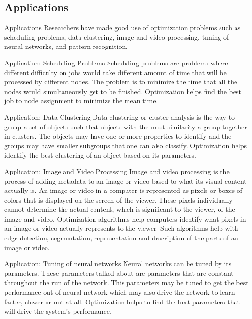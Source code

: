 \documentclass{beamer}
\begin{document}
\subsection{Applications}
\begin{frame}{Applications}
Researchers have made good use of optimization problems such as scheduling problems, data clustering, image and video processing, tuning of neural networks, and pattern recognition.
\end{frame}
\begin{frame}{Application: Scheduling Problems}
Scheduling problems are problems where different difficulty on jobs would take different amount of time that will be processed by different nodes. The problem is to minimize the time that all the nodes would simultaneously get to be finished. Optimization helps find the best job to node assignment to minimize the mean time.
\end{frame}
\begin{frame}{Application: Data Clustering}
Data clustering or cluster analysis is the way to group a set of objects such that objects with the most similarity a group together in clusters. The objects may have one or more properties to identify and the groups may have smaller subgroups that one can also classify. Optimization helps identify the best clustering of an object based on its parameters.

\end{frame}
\begin{frame}{Application: Image and Video Processing}
Image and video processing is the process of adding metadata to an image or video based to what its visual content actually is. An image or video in a computer is represented as pixels or boxes of colors that is displayed on the screen of the viewer. These pixels individually cannot determine the actual content, which is significant to the viewer, of the image and video. Optimization algorithms help computers identify what pixels in an image or video actually represents to the viewer. Such algorithms help with edge detection, segmentation, representation and description of the parts of an image or video.
\end{frame}
\begin{frame}{Application: Tuning of neural networks}
Neural networks can be tuned by its parameters. These parameters talked about are parameters that are constant throughout the run of the network. This parameters may be tuned to get the best performance out of neural network which may also drive the network to learn faster, slower or not at all. Optimization helps to find the best parameters that will drive the system's performance.

\end{frame}
\end{document}
